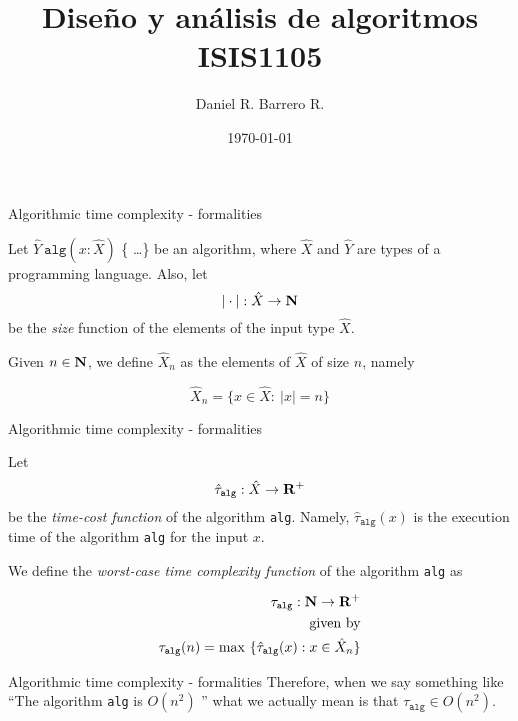 \documentclass{beamer}
\title{Diseño y análisis de algoritmos \\ ISIS1105}
\author{Daniel R. Barrero R.}
\institute{Universidad de los Andes}
\date{\today}
\begin{document}
\frame{\titlepage}

%

\begin{frame}{Algorithmic time complexity - formalities}
	\begin{defn}
		Let $\hat{Y}\ \mathtt{alg}(x : \hat{X})$ \{ \ldots \}
		be an algorithm, where $\hat{X}$ and $\hat{Y}$ are types
		of a programming language. Also, let
		\begin{equation*}
			|\cdot| : \hat{X} \to \mathbf{N}
		\end{equation*}
		be the \emph{size} function of the elements of the input type
		$\hat{X}$.

		Given $n \in \mathbf{N}$, we define $\hat{X}_n$ as the elements of
		$\hat{X}$ of size $n$, namely

		\begin{equation*}
			\hat{X}_n = \{x \in \hat{X} :\ |x| = n\}
		\end{equation*}
	\end{defn}
\end{frame}

%

\begin{frame}{Algorithmic time complexity - formalities}
	\begin{defn}
		Let 
		\begin{equation*}
			\hat{\tau}_{\mathtt{alg}}: \hat{X} \to \mathbf{R}^+
		\end{equation*}
		be the \emph{time-cost function} of the algorithm \texttt{alg}. Namely,
		$\hat{\tau}_\mathtt{alg}(x)$ is the execution time of the algorithm
		\texttt{alg} for the input $x$.

		We define the \emph{worst-case time complexity function} of the
		algorithm \texttt{alg} as

		\begin{eqnarray*}
			\tau_\mathtt{alg} : \mathbf{N} \to \mathbf{R}^+ \\
			\text{given by} \\
			\tau_\mathtt{alg}(n) = \max \ \{\hat{\tau}_\mathtt{alg} (x) :
			x \in \hat{X}_n\}
		\end{eqnarray*}
	\end{defn}
\end{frame}

%

\begin{frame}{Algorithmic time complexity - formalities}
	Therefore, when we say something like ``The algorithm \texttt{alg} is $O(n^2)$ ''
	what we actually mean is that $\tau_\mathtt{alg} \in O(n^2)$.
\end{frame}
\end{document}
